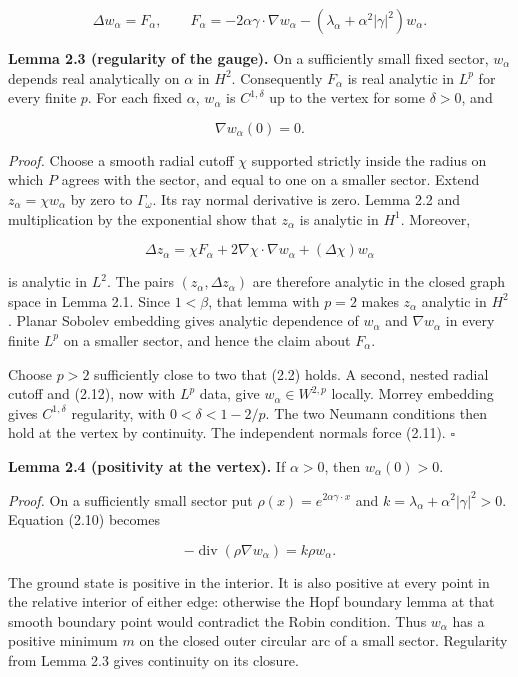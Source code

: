 \documentclass[11pt]{article}
\begin{document}
\[
\Delta w_\alpha=F_\alpha,
\qquad
F_\alpha=-2\alpha\gamma\cdot\nabla w_\alpha
-(\lambda_\alpha+\alpha^2|\gamma|^2)w_\alpha.
\tag{2.10}
\]

\textbf{Lemma 2.3 (regularity of the gauge).} On a sufficiently small
fixed sector, \(w_\alpha\) depends real analytically on \(\alpha\) in
\(H^2\). Consequently \(F_\alpha\) is real analytic in \(L^p\) for every
finite \(p\). For each fixed \(\alpha\), \(w_\alpha\) is
\(C^{1,\delta}\) up to the vertex for some \(\delta>0\), and

\[
\nabla w_\alpha(0)=0.
\tag{2.11}
\]

\emph{Proof.} Choose a smooth radial cutoff \(\chi\) supported strictly
inside the radius on which \(P\) agrees with the sector, and equal to
one on a smaller sector. Extend \(z_\alpha=\chi w_\alpha\) by zero to
\(\Gamma_\omega\). Its ray normal derivative is zero. Lemma 2.2 and
multiplication by the exponential show that \(z_\alpha\) is analytic in
\(H^1\). Moreover,

\[
\Delta z_\alpha
=\chi F_\alpha+2\nabla\chi\cdot\nabla w_\alpha
+(\Delta\chi)w_\alpha
\tag{2.12}
\]

is analytic in \(L^2\). The pairs \((z_\alpha,\Delta z_\alpha)\) are
therefore analytic in the closed graph space in Lemma 2.1. Since
\(1<\beta\), that lemma with \(p=2\) makes \(z_\alpha\) analytic in
\(H^2\). Planar Sobolev embedding gives analytic dependence of
\(w_\alpha\) and \(\nabla w_\alpha\) in every finite \(L^p\) on a
smaller sector, and hence the claim about \(F_\alpha\).

Choose \(p>2\) sufficiently close to two that (2.2) holds. A second,
nested radial cutoff and (2.12), now with \(L^p\) data, give
\(w_\alpha\in W^{2,p}\) locally. Morrey embedding gives \(C^{1,\delta}\)
regularity, with \(0<\delta<1-2/p\). The two Neumann conditions then
hold at the vertex by continuity. The independent normals force (2.11).
\(\square\)

\textbf{Lemma 2.4 (positivity at the vertex).} If \(\alpha>0\), then
\(w_\alpha(0)>0\).

\emph{Proof.} On a sufficiently small sector put
\(\rho(x)=e^{2\alpha\gamma\cdot x}\) and
\(k=\lambda_\alpha+\alpha^2|\gamma|^2>0\). Equation (2.10) becomes

\[
-\operatorname{div}(\rho\nabla w_\alpha)=k\rho w_\alpha.
\tag{2.13}
\]

The ground state is positive in the interior. It is also positive at
every point in the relative interior of either edge: otherwise the Hopf
boundary lemma at that smooth boundary point would contradict the Robin
condition. Thus \(w_\alpha\) has a positive minimum \(m\) on the closed
outer circular arc of a small sector. Regularity from Lemma 2.3 gives
continuity on its closure.
\end{document}
